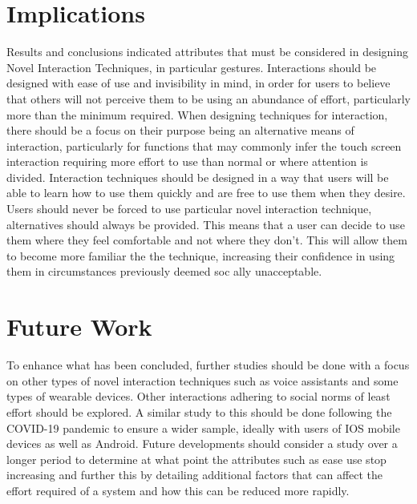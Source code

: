 \documentclass{l4proj}
\begin{document}
\section{Implications}
Results and conclusions indicated attributes that must be considered in designing Novel Interaction Techniques, in particular gestures. Interactions should be designed with ease of use and invisibility in mind, in order for users to believe that others will not perceive them to be using an abundance of effort, particularly more than the minimum required. When designing techniques for interaction, there should be a focus on their purpose being an alternative means of interaction, particularly for functions that may commonly infer the touch screen interaction requiring more effort to use than normal or where attention is divided. Interaction techniques should be designed in a way that users will be able to learn how to use them quickly and are free to use them when they desire. Users should never be forced to use particular novel interaction technique, alternatives should always be provided. This means that a user can decide to use them where they feel comfortable and not where they don't. This will allow them to become more familiar the the technique, increasing their confidence in using them in circumstances previously deemed soc ally unacceptable.

\section{Future Work}

To enhance what has been concluded, further studies should be done with a focus on other types of novel interaction techniques such as voice assistants and some types of wearable devices. Other interactions adhering to social norms of least effort should be explored. A similar study to this should be done following the COVID-19 pandemic to ensure a wider sample, ideally with users of IOS mobile devices as well as Android. Future developments should consider a study over a longer period to determine at what point the attributes such as ease use stop increasing and further this by detailing additional factors that can affect the effort required of a system and how this can be reduced more rapidly. 
\end{document}
